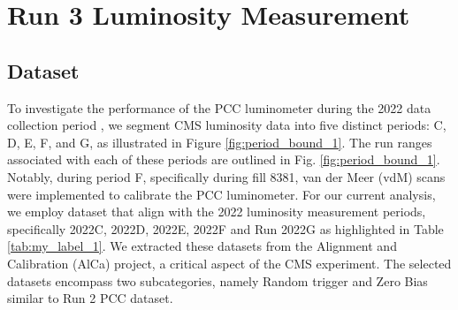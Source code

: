 \chapter{Run 3 Luminosity Measurement}  %

\ifpdf
    \graphicspath{{Chapter1/Figs/Raster/}{Chapter1/Figs/PDF/}{Chapter1/Figs/}}
\else
    \graphicspath{{Chapter1/Figs/Vector/}{Chapter1/Figs/}}
\fi








\section{Dataset}

To investigate the performance of the PCC luminometer during the 2022 data collection period \cite{Hayrapetyan:2870088}, we segment CMS luminosity data into five distinct periods:  C, D, E, F, and G, as illustrated in Figure \ref{fig:period_bound_1}. The run ranges associated with each of these periods are outlined in Fig. \ref{fig:period_bound_1}. Notably, during period F, specifically during fill 8381, van der Meer (vdM) scans were implemented to calibrate the PCC luminometer. For our current analysis, we employ dataset that align with the 2022 luminosity measurement periods, specifically 2022C, 2022D, 2022E, 2022F and Run 2022G as highlighted in Table \ref{tab:my_label_1}. We extracted these datasets from the Alignment and Calibration (AlCa) project, a critical aspect of the CMS experiment. The selected datasets encompass two subcategories, namely Random trigger and Zero Bias similar to Run 2 PCC dataset. %

